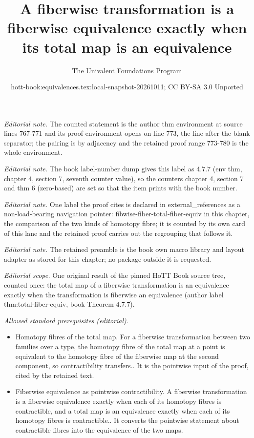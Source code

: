 \documentclass[10pt,a4paper]{article}
\title{A fiberwise transformation is a fiberwise equivalence exactly when its total map is an equivalence}
\author{The Univalent Foundations Program}
\date{hott-book:equivalences.tex:local-snapshot-20261011; CC BY-SA 3.0 Unported}
\newcounter{chapter}
\theoremstyle{definition}
\theoremstyle{remark}
\numberwithin{equation}{section}
\begin{document}
\maketitle
\setcounter{chapter}{4}
\setcounter{section}{7}
\setcounter{thm}{6}
\noindent\textit{Editorial note.} The counted statement is the author thm environment at source lines 767-771 and its proof environment opens on line 773, the line after the blank separator; the pairing is by adjacency and the retained proof range 773-780 is the whole environment.\par\medskip
\noindent\textit{Editorial note.} The book label-number dump gives this label as 4.7.7 (env thm, chapter 4, section 7, seventh counter value), so the counters chapter 4, section 7 and thm 6 (zero-based) are set so that the item prints with the book number.\par\medskip
\noindent\textit{Editorial note.} One label the proof cites is declared in external\_references as a non-load-bearing navigation pointer: fibwise-fiber-total-fiber-equiv in this chapter, the comparison of the two kinds of homotopy fibre; it is counted by its own card of this lane and the retained proof carries out the regrouping that follows it.\par\medskip
\noindent\textit{Editorial note.} The retained preamble is the book own macro library and layout adapter as stored for this chapter; no package outside it is requested.\par\medskip
\noindent\textit{Editorial scope.} One original result of the pinned HoTT Book source tree, counted once: the total map of a fiberwise transformation is an equivalence exactly when the transformation is fiberwise an equivalence (author label thm:total-fiber-equiv, book Theorem 4.7.7).\par\medskip
\noindent\textit{Allowed standard prerequisites (editorial).}\begin{itemize}
\item Homotopy fibres of the total map. For a fiberwise transformation between two families over a type, the homotopy fibre of the total map at a point is equivalent to the homotopy fibre of the fiberwise map at the second component, so contractibility transfers.. It is the pointwise input of the proof, cited by the retained text.
\item Fiberwise equivalence as pointwise contractibility. A fiberwise transformation is a fiberwise equivalence exactly when each of its homotopy fibres is contractible, and a total map is an equivalence exactly when each of its homotopy fibres is contractible.. It converts the pointwise statement about contractible fibres into the equivalence of the two maps.
\end{itemize}\medskip
\end{document}
